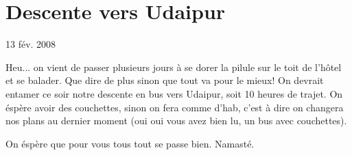 \section{Descente vers Udaipur}

13 fév. 2008

\begin{multicols}{2}

Heu... on vient de passer plusieurs jours à se dorer la pilule sur le toit de l'hôtel et se balader. Que dire de plus sinon que tout va pour le mieux! On devrait entamer ce soir notre descente en bus vers Udaipur, soit 10 heures de trajet. On éspère avoir des couchettes, sinon on fera comme d'hab, c'est à dire on changera nos plans au dernier moment (oui oui vous avez bien lu, un bus avec couchettes).

On éspère que pour vous tous tout se passe bien. Namasté.

\end{multicols}


